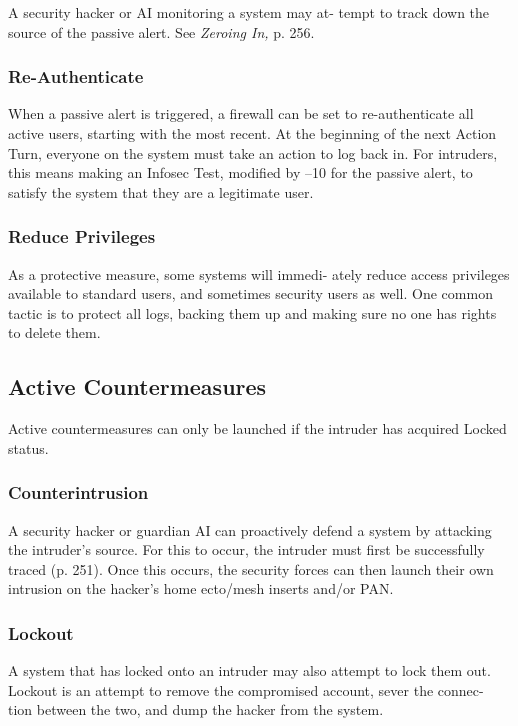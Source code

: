 A security hacker or AI monitoring a system may at-
tempt to track down the source of the passive alert. 
See \textit{Zeroing In,} p. 256.

\subsubsection{Re-Authenticate}

When a passive alert is triggered, a firewall can be set 
to re-authenticate all active users, starting with the 
most recent. At the beginning of the next Action Turn, 
everyone on the system must take an action to log 
back in. For intruders, this means making an Infosec 
Test, modified by –10 for the passive alert, to satisfy 
the system that they are a legitimate user.

\subsubsection{Reduce Privileges}

As a protective measure, some systems will immedi-
ately reduce access privileges available to standard 
users, and sometimes security users as well. One 
common tactic is to protect all logs, backing them up 
and making sure no one has rights to delete them.

\subsection{Active Countermeasures}

Active countermeasures can only be launched if the 
intruder has acquired Locked status.

\subsubsection{Counterintrusion}

A security hacker or guardian AI can proactively 
defend a system by attacking the intruder's source. For 
this to occur, the intruder must first be successfully 
traced (p. 251). Once this occurs, the security forces 
can then launch their own intrusion on the hacker's 
home ecto/mesh inserts and/or PAN.

\subsubsection{Lockout}

A system that has locked onto an intruder may also 
attempt to lock them out. Lockout is an attempt to 
remove the compromised account, sever the connec-
tion between the two, and dump the hacker from 
the system.

